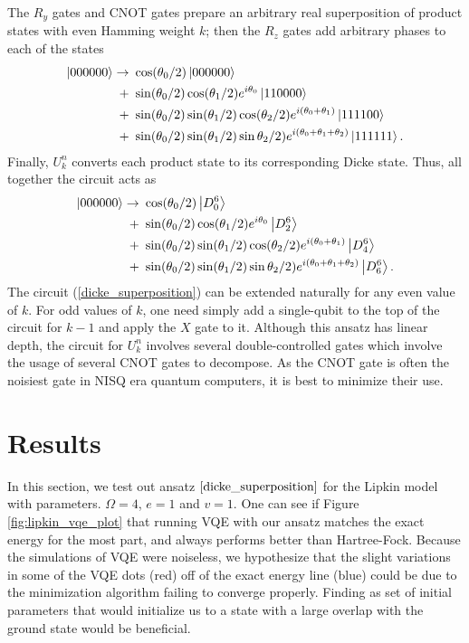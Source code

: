 \documentclass[Dual]{msu-thesis}
\begin{document}
The $R_y$ gates and CNOT gates prepare an arbitrary real superposition of product states with even Hamming weight $k$; then the $R_z$ gates add arbitrary phases to each of the states
\begin{align}
\ket{000000}
\to \ &\cos(\theta_0/2)\ket{000000} 
\nonumber
\\
+\ &\sin(\theta_0/2)\cos(\theta_1/2)e^{i\theta_0}\ket{110000} 
\nonumber
\\
+\ &\sin(\theta_0/2)\sin(\theta_1/2)\cos(\theta_2/2)e^{i(\theta_0+\theta_1)}\ket{111100}
\nonumber
\\
+\ &\sin(\theta_0/2)\sin(\theta_1/2)\sin\theta_2/2)e^{i(\theta_0+\theta_1+\theta_2)}\ket{111111}.
\end{align}
Finally, $U^n_k$ converts each product state to its corresponding Dicke state. Thus, all together the circuit acts as
\begin{align}
\ket{000000}
\to \ &\cos(\theta_0/2)\ket{D^6_0} 
\nonumber
\\
+\ &\sin(\theta_0/2)\cos(\theta_1/2)e^{i\theta_0}\ket{D^6_2} 
\nonumber
\\
+\ &\sin(\theta_0/2)\sin(\theta_1/2)\cos(\theta_2/2)e^{i(\theta_0+\theta_1)}\ket{D^6_4}
\nonumber
\\
+\ &\sin(\theta_0/2)\sin(\theta_1/2)\sin\theta_2/2)e^{i(\theta_0+\theta_1+\theta_2)}\ket{D^6_6}.
\end{align}
The circuit (\ref{dicke_superposition}) can be extended naturally for any even value of $k$. For odd values of $k$, one need simply add a single-qubit to the top of the circuit for $k-1$ and apply the $X$ gate to it. Although this ansatz has linear depth, the circuit for $U^n_k$ involves several double-controlled gates which involve the usage of several CNOT gates to decompose. As the CNOT gate is often the noisiest gate in NISQ era quantum computers, it is best to minimize their use.

\section{Results}

In this section, we test out ansatz $\ref{dicke_superposition}$ for the Lipkin model with parameters. $\Omega =4$, $e=1$ and $v=1$. One can see if Figure \ref{fig:lipkin_vqe_plot} that running VQE with our ansatz matches the exact energy for the most part, and always performs better than Hartree-Fock. Because the simulations of VQE were noiseless, we hypothesize that the slight variations in some of the VQE dots (red) off of the exact energy line (blue) could be due to the minimization algorithm failing to converge properly. Finding as set of initial parameters that would initialize us to a state with a large overlap with the ground state would be beneficial.
\end{document}
